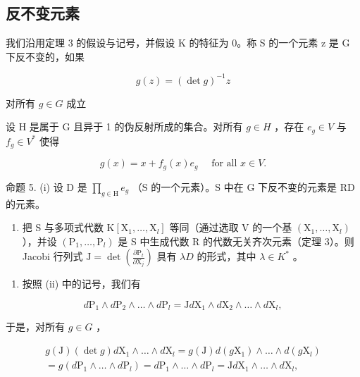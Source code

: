 \subsection{反不变元素}

我们沿用定理 3 的假设与记号，并假设 K 的特征为 0。称 S 的一个元素 z 是 G 下反不变的，如果

\[
g (z) = (\det g) ^ {- 1} z
\]

对所有 \(g\in G\) 成立

设 H 是属于 G 且异于 1 的伪反射所成的集合。对所有 \(g \in H\) ，存在 \(e_{g} \in V\) 与 \(f_{g} \in V^{*}\) 使得

\[
g (x) = x + f _ {g} (x) e _ {g} \quad \text {   for   all   } x \in V.
\]

命题 5. (i) 设 \(\mathrm{D}\) 是 \(\prod_{g \in \mathrm{H}} e_g\) （\(\mathrm{S}\) 的一个元素）。\(\mathrm{S}\) 中在 \(\mathrm{G}\) 下反不变的元素是 \(\mathrm{RD}\) 的元素。

\begin{enumerate}
\def\labelenumi{(\roman{enumi})}
\setcounter{enumi}{1}
\tightlist
\item
  把 S 与多项式代数 \(\mathrm{K}[\mathrm{X}_1,\dots ,\mathrm{X}_l]\) 等同（通过选取 V 的一个基 \((\mathrm{X}_1,\dots ,\mathrm{X}_l)\) ），并设 \((\mathrm{P}_1,\dots ,\mathrm{P}_l)\) 是 S 中生成代数 R 的代数无关齐次元素（定理 3）。则 Jacobi 行列式 \(\mathrm{J} = \det \left(\frac{\partial\mathrm{P}_t}{\partial\mathrm{X}_j}\right)\) 具有 \(\lambda D\) 的形式，其中 \(\lambda \in K^*\) 。
\end{enumerate}

\begin{enumerate}
\def\labelenumi{\alph{enumi})}
\tightlist
\item
  按照 (ii) 中的记号，我们有
\end{enumerate}

\[
d \mathrm{P} _ {1} \wedge d \mathrm{P} _ {2} \wedge \dots \wedge d \mathrm{P} _ {l} = \mathrm{J} d \mathrm{X} _ {1} \wedge d \mathrm{X} _ {2} \wedge \dots \wedge d \mathrm{X} _ {l},
\]

于是，对所有 \(g \in G\) ，

\[
\begin{array}{c} g (\mathrm{J}) (\det g)   d \mathrm{X} _ {1} \wedge \ldots \wedge d \mathrm{X} _ {l} = g (\mathrm{J})   d (g \mathrm{X} _ {1}) \wedge \ldots \wedge d (g \mathrm{X} _ {l}) \\ = g (d \mathrm{P} _ {1} \wedge \ldots \wedge d \mathrm{P} _ {l}) = d \mathrm{P} _ {1} \wedge \ldots \wedge d \mathrm{P} _ {l} = \mathrm{J}   d \mathrm{X} _ {1} \wedge \ldots \wedge d \mathrm{X} _ {l}, \end{array}
\]

